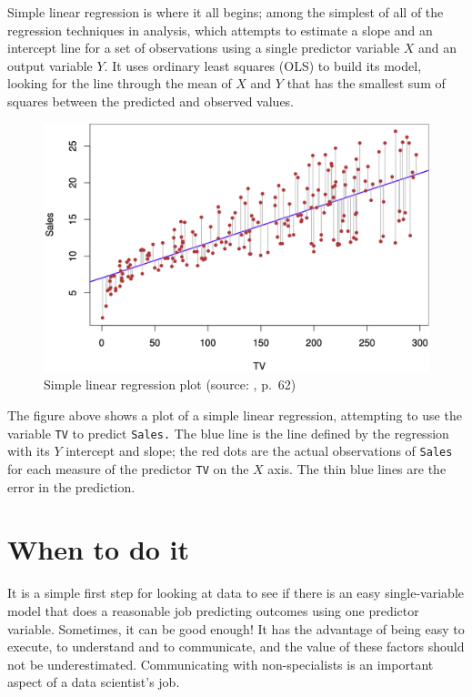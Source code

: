 \documentclass[
]{book}
\begin{document}
Simple linear regression is where it all begins; among the simplest of all of the regression techniques in analysis, which attempts to estimate a slope and an intercept line for a set of observations using a single predictor variable \(X\) and an output variable \(Y\). It uses ordinary least squares (OLS) to build its model, looking for the line through the mean of \(X\) and \(Y\) that has the smallest sum of squares between the predicted and observed values.



\begin{figure}
\includegraphics[width=16.03in]{images/3_1} \caption{Simple linear regression plot (source: \citet{ISLR}, p.~62)}\label{fig:img-slr1}
\end{figure}

The figure above shows a plot of a simple linear regression, attempting to use the variable \texttt{TV} to predict \texttt{Sales.} The blue line is the line defined by the regression with its \(Y\) intercept and slope; the red dots are the actual observations of \texttt{Sales} for each measure of the predictor \texttt{TV} on the \(X\) axis. The thin blue lines are the error in the prediction.

\hypertarget{when-to-do-it}{%
\section{When to do it}\label{when-to-do-it}}

It is a simple first step for looking at data to see if there is an easy single-variable model that does a reasonable job predicting outcomes using one predictor variable. Sometimes, it can be good enough! It has the advantage of being easy to execute, to understand and to communicate, and the value of these factors should not be underestimated. Communicating with non-specialists is an important aspect of a data scientist's job.
\end{document}
